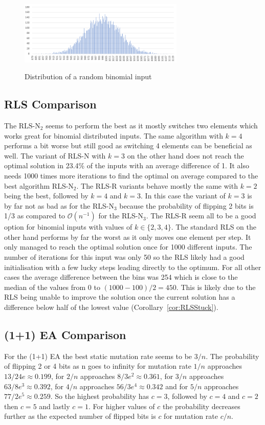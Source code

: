\begin{figure}[h]
      \caption{Distribution of a random binomial input}
      \centering
      \includegraphics[width=0.7\textwidth]{figures/images/numberGenerator/binomialDistributionForN10000p0_1.png}\label{fig:binDistExample}
\end{figure}
\subsection{RLS Comparison}




The $\text{RLS-N}_2$ seems to perform the best as it mostly switches two elements which works great for binomial distributed inputs. 
The same algorithm with $k=4$ performs a bit worse but still good as switching 4 elements can be beneficial as well.
The variant of RLS-N with $k=3$ on the other hand does not reach the optimal solution in 23.4\% of the inputs with an average difference of 1.
It also needs 1000 times more iterations to find the optimal on average compared to the best algorithm RLS-N$_2$.
The RLS-R variants behave mostly the same with $k=2$ being the best, followed by $k=4$ and $k=3$.
In this case the variant of $k=3$ is by far not as bad as for the RLS-N$_3$ because the probability of flipping 2 bits is 1/3 as compared to $\mathcal{O}(n^{-1})$ for the RLS-N$_3$.
The RLS-R seem all to be a good option for binomial inputs with values of $k\in\{2,3,4\}$.
The standard RLS on the other hand performs by far the worst as it only moves one element per step.
It only managed to reach the optimal solution once for 1000 different inputs.
The number of iterations for this input was only 50 so the RLS likely had a good initialisation with a few lucky steps leading directly to the optimum.
For all other cases the average difference between the bins was 254 which is close to the median of the values from 0 to $(1000-100)/2=450$.
This is likely due to the RLS being unable to improve the solution once the current solution has a difference below half of the lowest value (Corollary~\ref{cor:RLSStuck}).
\subsection{(1+1) EA Comparison}
For the (1+1) EA the best static mutation rate seems to be $3/n$. 
The probability of flipping 2 or 4 bits as n goes to infinity for mutation rate $1/n$ approaches $13/24e\approx 0.199$, for $2/n$ approaches $8/3e^2\approx 0.361$, for $3/n$ approaches $63/8e^3\approx 0.392$, for $4/n$ approaches $56/3e^4\approx 0.342$ and for $5/n$ approaches $77/2e^5\approx 0.259$.
So the highest probability has $c=3$, followed by $c=4$ and $c=2$ then $c=5$ and lastly $c=1$.
For higher values of $c$ the probability decreases further as the expected number of flipped bits is $c$ for mutation rate $c/n$.

